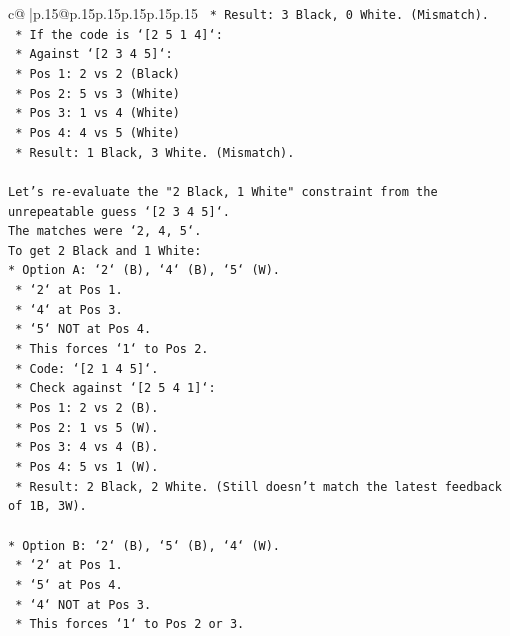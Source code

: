 \documentclass{article}
\begin{document}
{\begin{supertabular}{c@{$\;$}|p{.15\linewidth}@{}p{.15\linewidth}p{.15\linewidth}p{.15\linewidth}p{.15\linewidth}p{.15\linewidth}}
{{{\texttt{            *   Result: 3 Black, 0 White. (Mismatch).} \\
\texttt{    *   If the code is `{[}2 5 1 4{]}`:} \\
\texttt{        *   Against `{[}2 3 4 5{]}`:} \\
\texttt{            *   Pos 1: 2 vs 2 (Black)} \\
\texttt{            *   Pos 2: 5 vs 3 (White)} \\
\texttt{            *   Pos 3: 1 vs 4 (White)} \\
\texttt{            *   Pos 4: 4 vs 5 (White)} \\
\texttt{            *   Result: 1 Black, 3 White. (Mismatch).} \\
\\ 
\texttt{Let's re{-}evaluate the "2 Black, 1 White" constraint from the unrepeatable guess `{[}2 3 4 5{]}`.} \\
\texttt{The matches were `2, 4, 5`.} \\
\texttt{To get 2 Black and 1 White:} \\
\texttt{*   Option A: `2` (B), `4` (B), `5` (W).} \\
\texttt{    *   `2` at Pos 1.} \\
\texttt{    *   `4` at Pos 3.} \\
\texttt{    *   `5` NOT at Pos 4.} \\
\texttt{    *   This forces `1` to Pos 2.} \\
\texttt{    *   Code: `{[}2 1 4 5{]}`.} \\
\texttt{    *   Check against `{[}2 5 4 1{]}`:} \\
\texttt{        *   Pos 1: 2 vs 2 (B).} \\
\texttt{        *   Pos 2: 1 vs 5 (W).} \\
\texttt{        *   Pos 3: 4 vs 4 (B).} \\
\texttt{        *   Pos 4: 5 vs 1 (W).} \\
\texttt{        *   Result: 2 Black, 2 White. (Still doesn't match the latest feedback of 1B, 3W).} \\
\\ 
\texttt{*   Option B: `2` (B), `5` (B), `4` (W).} \\
\texttt{    *   `2` at Pos 1.} \\
\texttt{    *   `5` at Pos 4.} \\
\texttt{    *   `4` NOT at Pos 3.} \\
\texttt{    *   This forces `1` to Pos 2 or 3.} \\
}}}
\end{supertabular}}
\end{document}
